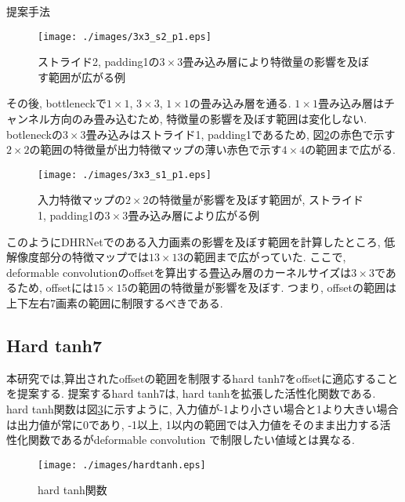 \begin{chapter}{提案手法}
\begin{figure}[H]
  \centering
  \texttt{[image: ./images/3x3\_s2\_p1.eps]}
  \caption{ストライド2, padding1の$3\times3$畳み込み層により特徴量の影響を及ぼす範囲が広がる例}
  \label{fig:3x3_s2_p1}
\end{figure}

その後, bottleneckで$1\times1$, $3\times3$, $1\times1$の畳み込み層を通る. $1\times1$畳み込み層はチャンネル方向のみ畳み込むため, 特徴量の影響を及ぼす範囲は変化しない. botleneckの$3\times3$畳み込みはストライド1, padding1であるため, 図\ref{fig:3x3_s1_p1}の赤色で示す$2\times2$の範囲の特徴量が出力特徴マップの薄い赤色で示す$4\times4$の範囲まで広がる. 

\begin{figure}[H]
  \centering
  \texttt{[image: ./images/3x3\_s1\_p1.eps]}
  \caption{入力特徴マップの$2\times2$の特徴量が影響を及ぼす範囲が, ストライド1, padding1の$3\times3$畳み込み層により広がる例}
  \label{fig:3x3_s1_p1}
\end{figure}

このようにDHRNetでのある入力画素の影響を及ぼす範囲を計算したところ, 低解像度部分の特徴マップでは$13\times13$の範囲まで広がっていた. ここで, deformable convolutionのoffsetを算出する畳込み層のカーネルサイズは$3\times3$であるため, offsetには$15\times15$の範囲の特徴量が影響を及ぼす. つまり, offsetの範囲は上下左右7画素の範囲に制限するべきである. 

\subsection{Hard tanh7}\label{subsec:hard_tanh7}
本研究では,算出されたoffsetの範囲を制限するhard tanh7をoffsetに適応することを提案する. 提案するhard tanh7は, hard tanh\cite{raghu2017expressive}を拡張した活性化関数である.  hard tanh関数は図\ref{fig:hardtanh}に示すように, 入力値が-1より小さい場合と1より大きい場合は出力値が常に0であり, -1以上, 1以内の範囲では入力値をそのまま出力する活性化関数であるがdeformable convolution で制限したい値域とは異なる. 

\begin{figure}[H]
  \centering
  \texttt{[image: ./images/hardtanh.eps]}
  \caption{hard tanh関数}
  \label{fig:hardtanh}
\end{figure}


\end{chapter}
